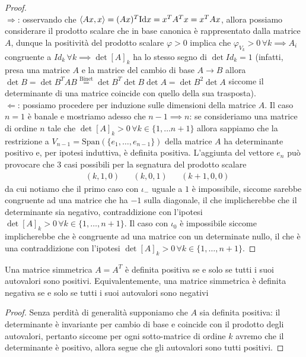 \begin{proof} \hspace{1cm} \\
$\boxed{\Rightarrow}$: osservando che $\langle Ax, x \rangle = (Ax)^T \text{Id} x = x^T A^T x = x^T A x$, allora possiamo considerare il prodotto scalare che in base canonica è rappresentato dalla matrice $A$, dunque la positività del prodotto scalare $\varphi > 0$ implica che $\varphi_{V_k} > 0 \, \forall k \implies A_i$ congruente a $Id_k \, \forall k \implies \det{[A]_k}$ ha lo stesso segno di $\det{Id_k} = 1$ (infatti, presa una matrice $A$ e la matrice del cambio di base $A \to B$ allora $\det{B} = \det{B^T A B} \stackrel{\text{Binet}}{=} \det{B^T}\det{B}\det{A} = \det{B}^2 \det{A}$ siccome il determinante di una matrice coincide con quello della sua trasposta). \\
$\boxed{\Leftarrow}$: possiamo procedere per induzione sulle dimensioni della matrice $A$. Il caso $n=1$ è banale e mostriamo adesso che $n-1 \implies n$: se consideriamo una matrice di ordine $n$ tale che $\det{[A]_{k}} > 0 \, \forall k \in \{1, \ldots n+1 \}$ allora sappiamo che la restrizione a $V_{n-1} = \text{Span}(\{e_1, \ldots, e_{n-1} \})$ della matrice $A$ ha determinante positivo e, per ipotesi induttiva, è definita positiva. L'aggiunta del vettore $e_n$ può provocare che $3$ casi possibili per la segnatura del prodotto scalare
\begin{align*}
&(k, 1, 0) & &(k, 0, 1) & &(k+1, 0, 0)
\end{align*}
da cui notiamo che il primo caso con $\iota_-$ uguale a $1$ è impossibile, siccome sarebbe congruente ad una matrice che ha $-1$ sulla diagonale, il che implicherebbe che il determinante sia negativo, contraddizione con l'ipotesi $\det{[A]_k} > 0 \, \forall k \in \{1, \ldots, n+1\}$. Il caso con $\iota_0$ è impossibile siccome implicherebbe che è congruente ad una matrice con un determinate nullo, il che è una contraddizione con l'ipotesi $\det{[A]_k} > 0 \, \forall k \in \{1, \ldots, n+1 \}$.
\end{proof}
\begin{cor}
Una matrice simmetrica $A=A^T$ è definita positiva se e solo se tutti i suoi autovalori sono positivi. Equivalentemente, una matrice simmetrica è definita negativa se e solo se tutti i suoi autovalori sono negativi
\end{cor}
\begin{proof}
Senza perdità di generalità supponiamo che $A$ sia definita positiva: il determinante è invariante per cambio di base e coincide con il prodotto degli autovalori, pertanto siccome per ogni sotto-matrice di ordine $k$ avremo che il determinante è positivo, allora segue che gli autovalori sono tutti positivi.
\end{proof}
